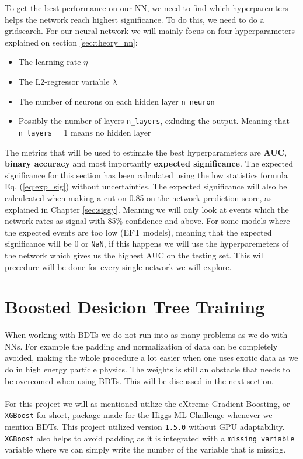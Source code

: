 \documentclass[12pt, a4paper]{book}
\begin{document}
To get the best performance on our NN, we need to find which hyperparemters helps the network reach highest significance. To do this, we need to do a gridsearch. 
For our neural network we will mainly focus on four hyperparameters explained on section \ref{sec:theory_nn}:
\begin{itemize}
   \item The learning rate $\eta$
   \item The L2-regressor variable $\lambda$
   \item The number of neurons on each hidden layer \verb|n_neuron|
   \item Possibly the number of layers \verb|n_layers|, exluding the output. Meaning that \verb|n_layers| = 1 means no hidden layer
\end{itemize}
The metrics that will be used to estimate the best hyperparameters are \textbf{AUC}, \textbf{binary accuracy} and most importantly \textbf{expected significance}. 
The expected significance for this section has been calculated using the low statistics formula Eq. (\ref{eq:exp_sig}) without uncertainties. The expected significance will also be calculcated when making a cut on 0.85 on the network prediction score, as explained in Chapter \ref{sec:siggy}. 
Meaning we will only look at events which the network rates as signal with 85\% confidence and above. For some models where the expected events are too low (EFT models), meaning that the expected significance will be 0 or \verb|NaN|, if this happens we will use the hyperparemeters of the network 
which gives us the highest AUC on the testing set. This will precedure will be done for every single network we will explore.
\clearpage


\section{Boosted Desicion Tree Training}
When working with BDTs we do not run into as many problems as we do with NNs. For example the padding and normalization of data can be completely avoided, making the whole procedure a lot easier when one uses exotic data as we do in high energy particle physics.
The weights is still an obstacle that needs to be overcomed when using BDTs. This will be discussed in the next section.\\
\\For this project we will as mentioned utilize the eXtreme Gradient Boosting, or \verb|XGBoost| for short, package \cite{XGBoost} made for the Higgs ML Challenge \cite{HiggsChallenge} whenever we mention BDTs.
This project utilized version \verb|1.5.0| without GPU adaptability. \verb|XGBoost| also helps to avoid padding as it is integrated with a \verb|missing_variable| variable where we can simply write the number of the variable that is missing.
\end{document}

